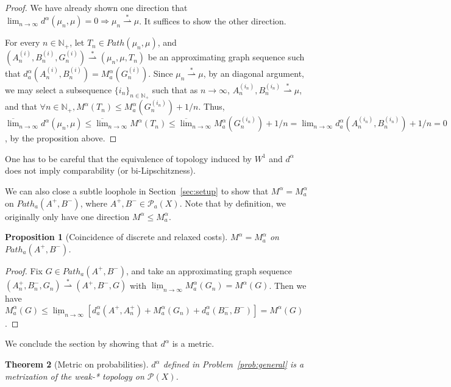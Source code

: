 \documentclass[fleqn]{article}
\newtheorem{thm}{Theorem}[section]
\newtheorem{prop}[thm]{Proposition}
\theoremstyle{definition}
\theoremstyle{remark}
\newcommand{\linf}[1][n]{\underline{\lim}_{#1\rightarrow\infty}} %
\newcommand{\lsup}[1][n]{\overline{\lim}_{#1\rightarrow\infty}} %
\renewcommand{\l}[1][n]{\lim_{#1\rightarrow\infty}} %
\renewcommand{\P}{\mathcal{P}} %
\newcommand{\wstar}{\stackrel{*}{\rightharpoonup}} %
\begin{document}
\begin{proof}
We have already shown one direction that $\l d^\alpha(\mu_n,\mu)=0 \Rightarrow \mu_n \wstar \mu$. It suffices to show the other direction.
\par
For every $n\in\mathbb{N}_+$, let $T_n\in Path(\mu_n,\mu)$, and $\left(A_n^{(i)},B_n^{(i)},G_n^{(i)}\right) \wstar (\mu_n,\mu,T_n)$ be an approximating graph sequence such that $d_a^\alpha \left(A_n^{(i)},B_n^{(i)}\right)=M_a^\alpha \left(G_n^{(i)}\right)$. Since $\mu_n \wstar \mu$, by an diagonal argument, we may select a subsequence $\{i_n\}_{n\in\mathbb{N}_+}$ such that as $n\rightarrow\infty$, $A_n^{(i_n)},B_n^{(i_n)} \wstar \mu$, and that $\forall n\in\mathbb{N}_+, M^\alpha(T_n) \le M_a^\alpha \left(G_n^{(i_n)}\right) + 1/n$. Thus,
$\lsup d^\alpha(\mu_n,\mu) \le \lsup M^\alpha(T_n) \le \lsup M_a^\alpha \left(G_n^{(i_n)}\right) + 1/n = \l d_a^\alpha \left(A_n^{(i_n)},B_n^{(i_n)}\right) + 1/n = 0 $, by the proposition above.
\end{proof}

\par
One has to be careful that the equivalence of topology induced by $W^1$ and $d^\alpha$ does not imply comparability (or bi-Lipschitzness).
\par
We can also close a subtle loophole in Section~\ref{sec:setup} to show that $M^\alpha = M_a^\alpha$ on $Path_a(A^+,B^-)$, where $A^+,B^- \in\P_a(X)$. Note that by definition, we originally only have one direction $M^\alpha \le M_a^\alpha$.
\begin{prop}[Coincidence of discrete and relaxed costs]
$M^\alpha = M_a^\alpha$ on $Path_a(A^+,B^-)$.
\end{prop}

\begin{proof}
Fix $G\in Path_a(A^+,B^-)$, and take an approximating graph sequence $(A_n^+,B_n^-,G_n) \wstar (A^+,B^-,G)$ with $\linf M_a^\alpha(G_n)=M^\alpha(G)$. Then we have $M_a^\alpha(G) \le \linf \left[d_a^\alpha(A^+,A_n^+) + M_a^\alpha(G_n) + d_a^\alpha(B_n^-,B^-)\right]= M^\alpha(G)$.
\end{proof}

\par
We conclude the section by showing that $d^\alpha$ is a metric.
\begin{thm}[Metric on probabilities]
$d^\alpha$ defined in Problem~\ref{prob:general} is a metrization of the weak-* topology on $\P(X)$.
\end{thm}
\end{document}
